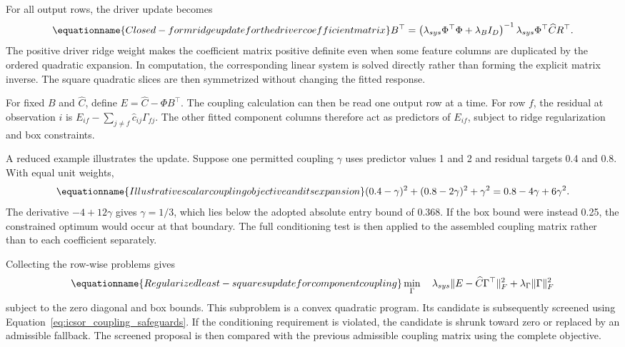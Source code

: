 For all output rows, the driver update becomes
\begin{equation}
\equationname{Closed-form ridge update for the driver coefficient matrix}
\label{eq:icsor_ridge_update}
B^\top=
\left(\lambda_{sys}\Phi^\top\Phi+\lambda_B I_D\right)^{-1}
\lambda_{sys}\Phi^\top\widehat C R^\top.
\end{equation}
The positive driver ridge weight makes the coefficient matrix positive definite even when some feature columns are duplicated by the ordered quadratic expansion. In computation, the corresponding linear system is solved directly rather than forming the explicit matrix inverse. The square quadratic slices are then symmetrized without changing the fitted response.

For fixed \(B\) and \(\widehat C\), define \(E=\widehat C-\Phi B^\top\). The coupling calculation can then be read one output row at a time. For row \(f\), the residual at observation \(i\) is \(E_{if}-\sum_{j\neq f}\widehat c_{ij}\Gamma_{fj}\). The other fitted component columns therefore act as predictors of \(E_{if}\), subject to ridge regularization and box constraints.

A reduced example illustrates the update. Suppose one permitted coupling \(\gamma\) uses predictor values 1 and 2 and residual targets 0.4 and 0.8. With equal unit weights,
\begin{equation}
\equationname{Illustrative scalar coupling objective and its expansion}
\label{eq:icsor_coupling_numeric_update}
(0.4-\gamma)^2+(0.8-2\gamma)^2+\gamma^2
=0.8-4\gamma+6\gamma^2.
\end{equation}
The derivative \(-4+12\gamma\) gives \(\gamma=1/3\), which lies below the adopted absolute entry bound of 0.368. If the box bound were instead 0.25, the constrained optimum would occur at that boundary. The full conditioning test is then applied to the assembled coupling matrix rather than to each coefficient separately.

Collecting the row-wise problems gives
\begin{equation}
\equationname{Regularized least-squares update for component coupling}
\label{eq:icsor_coupling_update}
\min_{\Gamma}\quad
\lambda_{sys}\|E-\widehat C\Gamma^\top\|_F^2+
\lambda_{\Gamma}\|\Gamma\|_F^2
\end{equation}
subject to the zero diagonal and box bounds. This subproblem is a convex quadratic program. Its candidate is subsequently screened using Equation~\eqref{eq:icsor_coupling_safeguards}. If the conditioning requirement is violated, the candidate is shrunk toward zero or replaced by an admissible fallback. The screened proposal is then compared with the previous admissible coupling matrix using the complete objective.

